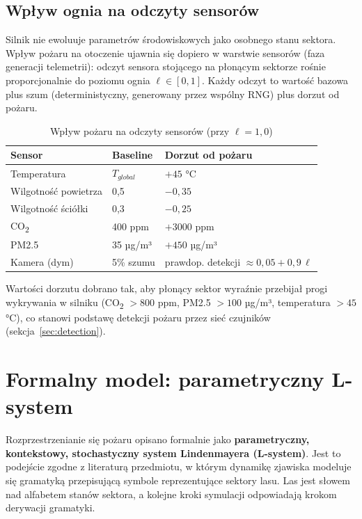 \subsection{Wpływ ognia na odczyty sensorów}
\label{sec:sensors-fire}

Silnik nie ewoluuje parametrów środowiskowych jako osobnego stanu sektora. Wpływ pożaru na otoczenie ujawnia się dopiero w warstwie sensorów (faza generacji telemetrii): odczyt sensora stojącego na płonącym sektorze rośnie proporcjonalnie do poziomu ognia $\ell \in [0,1]$. Każdy odczyt to wartość bazowa plus szum (deterministyczny, generowany przez wspólny RNG) plus dorzut od pożaru.

\begin{table}[h!]
\centering
\caption{Wpływ pożaru na odczyty sensorów (przy $\ell = 1{,}0$)}
\begin{tabular}{|l|l|l|}
\hline
\textbf{Sensor} & \textbf{Baseline} & \textbf{Dorzut od pożaru} \\ \hline
Temperatura          & $T_{global}$ & $+45$ °C \\ \hline
Wilgotność powietrza & 0,5          & $-0{,}35$ \\ \hline
Wilgotność ściółki   & 0,3          & $-0{,}25$ \\ \hline
CO\textsubscript{2}  & 400 ppm      & $+3000$ ppm \\ \hline
PM2.5                & 35 µg/m³     & $+450$ µg/m³ \\ \hline
Kamera (dym)         & 5\% szumu    & prawdop. detekcji $\approx 0{,}05 + 0{,}9\,\ell$ \\ \hline
\end{tabular}
\end{table}

Wartości dorzutu dobrano tak, aby płonący sektor wyraźnie przebijał progi wykrywania w silniku (CO\textsubscript{2} $> 800$ ppm, PM2.5 $> 100$ µg/m³, temperatura $> 45$ °C), co stanowi podstawę detekcji pożaru przez sieć czujników (sekcja~\ref{sec:detection}).

\section{Formalny model: parametryczny L-system}
\label{sec:lsystem}

Rozprzestrzenianie się pożaru opisano formalnie jako \textbf{parametryczny, kontekstowy, stochastyczny system Lindenmayera (L-system)}. Jest to podejście zgodne z literaturą przedmiotu, w którym dynamikę zjawiska modeluje się gramatyką przepisującą symbole reprezentujące sektory lasu. Las jest słowem nad alfabetem stanów sektora, a kolejne kroki symulacji odpowiadają krokom derywacji gramatyki.

